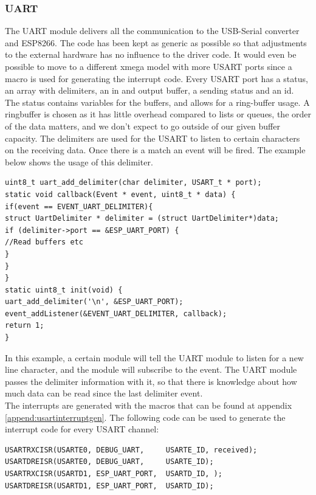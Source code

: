 \subsubsection{UART}
The UART module delivers all the communication to the USB-Serial converter and ESP8266. The code has been kept as generic as possible so that adjustments to the external hardware has no influence to the driver code. It would even be possible to move to a different xmega model with more USART ports since a macro is used for generating the interrupt code. Every USART port has a status, an array with delimiters, an in and output buffer, a sending status and an id. The status contains variables for the buffers, and allows for a ring-buffer usage. A ringbuffer is chosen as it has little overhead compared to lists or queues, the order of the data matters, and we don't expect to go outside of our given buffer capacity. The delimiters are used for the USART to listen to certain characters on the receiving data. Once there is a match an event will be fired. The example below shows the usage of this delimiter.
\begin{verbatim}
uint8_t uart_add_delimiter(char delimiter, USART_t * port);
static void callback(Event * event, uint8_t * data) {
if(event == EVENT_UART_DELIMITER){
struct UartDelimiter * delimiter = (struct UartDelimiter*)data;
if (delimiter->port == &ESP_UART_PORT) {
//Read buffers etc
}
}
}
static uint8_t init(void) {
uart_add_delimiter('\n', &ESP_UART_PORT);
event_addListener(&EVENT_UART_DELIMITER, callback);
return 1;
}
\end{verbatim}
In this example, a certain module will tell the UART module to listen for a new line character, and the module will subscribe to the event. The UART module passes the delimiter information with it, so that there is knowledge about how much data can be read since the last delimiter event.\\ 
The interrupts are generated with the macros that can be found at appendix \ref{append:usartinterruptgen}.
The following code can be used to generate the interrupt code for every USART channel:
\begin{verbatim}
USARTRXCISR(USARTE0, DEBUG_UART,     USARTE_ID, received);
USARTDREISR(USARTE0, DEBUG_UART,     USARTE_ID);
USARTRXCISR(USARTD1, ESP_UART_PORT,  USARTD_ID, );
USARTDREISR(USARTD1, ESP_UART_PORT,  USARTD_ID);
\end{verbatim}
